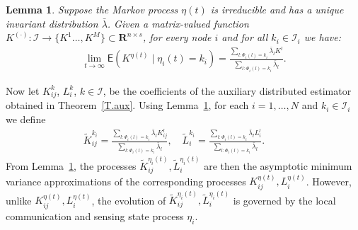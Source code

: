 \documentclass[a4paper,twocolumn]{autart}
\newtheorem{lemma}{Lemma}
\begin{document}
\begin{lemma}
  \label{prop:1}
  Suppose the Markov process $\eta(t)$ is irreducible and has a unique
  invariant distribution $\bar\lambda$. Given a matrix-valued function
  $K^{(\cdot)}:\mathcal{I}\to \{K^1\ldots, K^M\}\subset 
  \mathbf{R}^{n\times s}$, for every node $i$ and for all
  $k_i\in\mathcal{I}_{i}$  we have:  
  \begin{eqnarray}
    \lim_{t\to\infty} \mathsf{E}\left(K^{\eta(t)} \mid \eta_{i}(t) = k_i\right)
= \frac{\sum_{l:\Phi_i(l)=k_i}
        \bar\lambda_lK^l}
    {\sum_{l:\Phi_i(l)=k_i}\bar\lambda_l}.
  \end{eqnarray}
\end{lemma}





Now let $K_{ij}^k$, $L_i^k$, $k\in\mathcal{I}$, be the coefficients of the
auxiliary distributed estimator obtained in
Theorem~\ref{T.aux}. Using Lemma~\ref{prop:1}, for each $i=1,\ldots,
N$ and $k_i\in\mathcal{I}_i$ we define 
  \begin{eqnarray}
    \tilde K_{ij}^{k_i}    = \frac{\sum_{l:\Phi_i(l)=k_i}
        \bar\lambda_lK_{ij}^l}
    {\sum_{l:\Phi_i(l)=k_i}\bar\lambda_l},\label{Kim.tilde}
\quad
    \tilde L_i^{k_i}= \frac{\sum_{l:\Phi_i(l)=k_i} \bar\lambda_l L_i^l}
    {\sum_{l:\Phi_i(l)=k_i}\bar\lambda_l}. \qquad
 \label{Lim.tilde} 
  \end{eqnarray}
From Lemma~\ref{prop:1}, the processes $\tilde K_{ij}^{\eta_i(t)},
\tilde L_i^{\eta_i(t)}$  are then
the asymptotic minimum variance approximations of the corresponding processes
$K_{ij}^{\eta(t)}, L_i^{\eta(t)}$. 
However, unlike $K_{ij}^{\eta(t)}, L_i^{\eta(t)}$, the
evolution of $\tilde
K_{ij}^{\eta_i(t)}, \tilde L_i^{\eta_i(t)}$ is governed by the local
communication and sensing state process $\eta_i$.  
\end{document}

